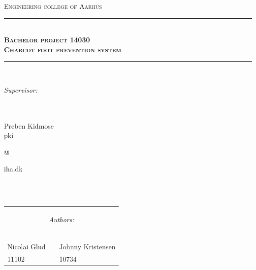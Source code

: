 \newcommand{\HRule}{\rule{\linewidth}{0.5mm}} %

\begin{center} %
 

\textsc{\LARGE Engineering college of Aarhus}\\[1.5cm] %


\HRule \\[0.4cm]
{ \Large \bfseries \textsc{Bachelor project 14030}}\\[0.4cm] %
{ \huge \bfseries \textsc{Charcot foot prevention system}} %
\HRule \\[1.5cm]

\begin{center}
\begin{Large}\textit{Supervisor:}\end{Large}\\
\ \\
Preben Kidmose\\
pki\begin{Large}@\end{Large}iha.dk
\end{center}
\ \\
\ \\
\begin{table}[H]
\centering
\begin{tabular}{p{4cm} c p{4cm}}
\multicolumn{3}{c}{\begin{Large}\textit{Authors:}\end{Large}}\\
\\
\\
\cline{1-1} \cline{3-3}\\
Nicolai Glud & & Johnny Kristensen \\
11102 & & 10734
\end{tabular}
\end{table}
\ \\


\end{center}
